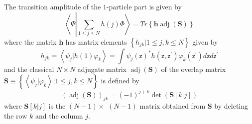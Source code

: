 \documentclass[aps,preprint]{revtex4}%
\begin{document}
The transition amplitude of the $1$-particle part is given by
\begin{equation}
\left\langle \Psi\left\vert
{\displaystyle\sum\limits_{1\leq j\leq N}}
h\left(  j\right)  \right.  \Phi\right\rangle =Tr\left\{  \mathbf{h}%
\operatorname{adj}\left(  \mathbf{S}\right)  \right\}
\end{equation}
where the matrix $\mathbf{h}$ has matrix elements $\left\{  h_{jk}|1\leq
j,k\leq N\right\}  $ given by
\begin{equation}
h_{jk}=\left\langle \psi_{j}|h\left(  1\right)  \varphi_{k}\right\rangle =%
{\displaystyle\int}
\psi_{j}\left(  \mathsf{z}\right)  ^{\ast}h\left(  \mathsf{z,z}^{\prime
}\right)  \varphi_{k}\left(  \mathsf{z}^{\prime}\right)  d\mathsf{z}%
d\mathsf{z}^{\prime}%
\end{equation}
and the classical $N\times N$ adjugate matrix $\operatorname{adj}\left(
\mathbf{S}\right)  $ of the overlap matrix $\mathbf{S\equiv}\left\{
\left\langle \psi_{j}|\varphi_{k}\right\rangle |1\leq j,k\leq N\right\}  $ is
defined by
\begin{equation}
\left(  \operatorname{adj}\left(  \mathbf{S}\right)  \right)  _{jk}=\left(
-1\right)  ^{j+k}\det\left(  \mathbf{S}\left[  k|j\right]  \right)
\end{equation}
where $\mathbf{S}\left[  k|j\right]  $ is the $\left(  N-1\right)  \times$
$\left(  N-1\right)  $ matrix obtained from $\mathbf{S}$ by deleting the row
$k$ and the column $j$.
\end{document}
